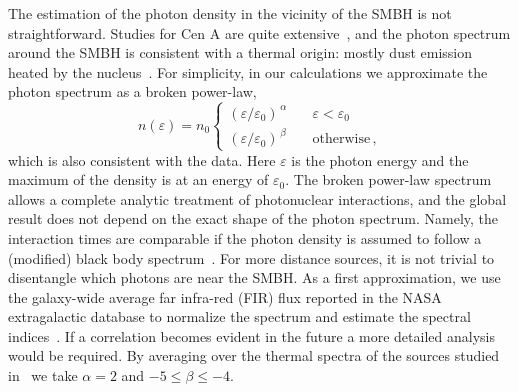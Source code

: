 \documentclass[aps,prd,twocolumn,superscriptaddress,tightenlines,nofootinbib]{revtex4-1}
\begin{document}
 The estimation of the photon density in the vicinity of
  the SMBH is not straightforward. Studies for Cen A are quite
  extensive~\cite{Whysong:2002ks,Meisenheimer:2007zv}, and the photon
  spectrum around the SMBH is consistent with a thermal origin: mostly dust emission
  heated by the nucleus~\cite{Whysong:2002ks}. For simplicity, in our
  calculations we approximate the photon spectrum as a broken
  power-law,
\begin{equation}
      n(\varepsilon) = n_0
        \begin{cases}
           (\varepsilon/\varepsilon_0)^{\, \alpha} & \quad \varepsilon < \varepsilon_0 \\
           (\varepsilon/\varepsilon_0)^{\, \beta} & \quad \text{otherwise} \, ,
        \end{cases}
\label{app:eq:photonfield}
\end{equation}
which is also consistent with the data. Here $\varepsilon$ is the
photon energy and the maximum of the density is at an energy of
$\varepsilon_0$. The broken power-law spectrum allows a complete
analytic treatment of photonuclear interactions, and the global result
does not depend on the exact shape of the photon spectrum.  Namely,
the interaction times are comparable if the photon density is assumed
to follow a (modified) black body spectrum~\cite{Unger:2015laa}.  For more distance
sources, it is not trivial to disentangle which photons are near the
SMBH. As a first approximation, we use the galaxy-wide average far
infra-red (FIR) flux reported in the NASA extragalactic database to
normalize the spectrum and estimate the spectral indices~\cite{NED}. If a
correlation becomes evident in the future a more detailed analysis
would be required. By averaging over the thermal spectra of the
sources studied in~\cite{Wiklind} we take $\alpha = 2$ and
\mbox{$-5 \leq \beta \leq -4$.} 
\end{document}

